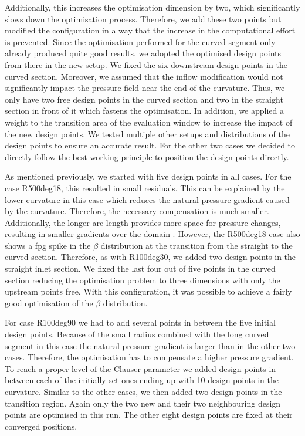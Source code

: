 Additionally, this increases the optimisation dimension by two, which significantly slows down the optimisation process.
Therefore, we add these two points but modified the configuration in a way that the increase in the computational effort is prevented.
Since the optimisation performed for the curved segment only already produced quite good results, we adopted the optimised design points from there in the new setup. 
We fixed the six downstream design points in the curved section.
Moreover, we assumed that the inflow modification would not significantly impact the pressure field near the end of the curvature.
Thus, we only have two free design points in the curved section and two in the straight section in front of it which fastens the optimisation.
In addition, we applied a weight to the transition area of the evaluation window to increase the impact of the new design points.
We tested multiple other setups and distributions of the design points to ensure an accurate result.
For the other two cases we decided to directly follow the best working principle to position the design points directly.


As mentioned previously, we started with five design points in all cases.
For the case R500deg18, this resulted in small residuals.
This can be explained by the lower curvature in this case which reduces the natural pressure gradient caused by the curvature.
Therefore, the necessary compensation is much smaller. 
Additionally, the longer arc length provides more space for pressure changes, resulting in smaller gradients over the domain \citep{patel_longitudinal_1997}.
However, the R500deg18 case also shows a \acrshort{fpg} spike in the $\beta$ distribution at the transition from the straight to the curved section.
Therefore, as with R100deg30, we added two design points in the straight inlet section. 
We fixed the last four out of five points in the curved section reducing the optimisation problem to three dimensions with only the upstream points free.
With this configuration, it was possible to achieve a fairly good optimisation of the $\beta$ distribution.


For case R100deg90 we had to add several points in between the five initial design points.
Because of the small radius combined with the long curved segment in this case the natural pressure gradient is larger than in the other two cases.
Therefore, the optimisation has to compensate a higher pressure gradient.
To reach a proper level of the Clauser parameter we added design points in between each of the initially set ones ending up with 10 design points in the curvature.
Similar to the other cases, we then added two design points in the transition region.
Again only the two new and their two neighbouring design points are optimised in this run.
The other eight design points are fixed at their converged positions.


